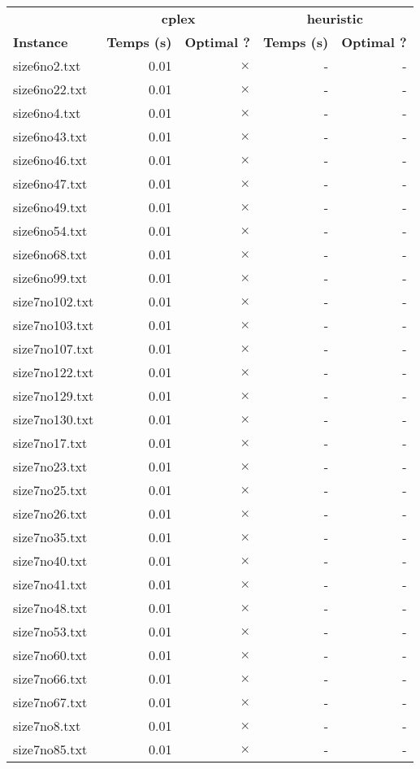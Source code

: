 \documentclass{article}
\begin{document}
\newpage
\begin{center}
\renewcommand{\arraystretch}{1.4} 
 \begin{tabular}{lrrrr}
	\hline
 & \multicolumn{2}{c}{\textbf{cplex}} & \multicolumn{2}{c}{\textbf{heuristic}}\\
\textbf{Instance}  & \textbf{Temps (s)} & \textbf{Optimal ?}  & \textbf{Temps (s)} & \textbf{Optimal ?} \\\hline

size6no2.txt & 0.01 & 
$\times$
 & - & - 
\\
size6no22.txt & 0.01 & 
$\times$
 & - & - 
\\
size6no4.txt & 0.01 & 
$\times$
 & - & - 
\\
size6no43.txt & 0.01 & 
$\times$
 & - & - 
\\
size6no46.txt & 0.01 & 
$\times$
 & - & - 
\\
size6no47.txt & 0.01 & 
$\times$
 & - & - 
\\
size6no49.txt & 0.01 & 
$\times$
 & - & - 
\\
size6no54.txt & 0.01 & 
$\times$
 & - & - 
\\
size6no68.txt & 0.01 & 
$\times$
 & - & - 
\\
size6no99.txt & 0.01 & 
$\times$
 & - & - 
\\
size7no102.txt & 0.01 & 
$\times$
 & - & - 
\\
size7no103.txt & 0.01 & 
$\times$
 & - & - 
\\
size7no107.txt & 0.01 & 
$\times$
 & - & - 
\\
size7no122.txt & 0.01 & 
$\times$
 & - & - 
\\
size7no129.txt & 0.01 & 
$\times$
 & - & - 
\\
size7no130.txt & 0.01 & 
$\times$
 & - & - 
\\
size7no17.txt & 0.01 & 
$\times$
 & - & - 
\\
size7no23.txt & 0.01 & 
$\times$
 & - & - 
\\
size7no25.txt & 0.01 & 
$\times$
 & - & - 
\\
size7no26.txt & 0.01 & 
$\times$
 & - & - 
\\
size7no35.txt & 0.01 & 
$\times$
 & - & - 
\\
size7no40.txt & 0.01 & 
$\times$
 & - & - 
\\
size7no41.txt & 0.01 & 
$\times$
 & - & - 
\\
size7no48.txt & 0.01 & 
$\times$
 & - & - 
\\
size7no53.txt & 0.01 & 
$\times$
 & - & - 
\\
size7no60.txt & 0.01 & 
$\times$
 & - & - 
\\
size7no66.txt & 0.01 & 
$\times$
 & - & - 
\\
size7no67.txt & 0.01 & 
$\times$
 & - & - 
\\
size7no8.txt & 0.01 & 
$\times$
 & - & - 
\\
size7no85.txt & 0.01 & 
$\times$
 & - & - 
\\
\hline\end{tabular}
\end{center}
\end{document}
